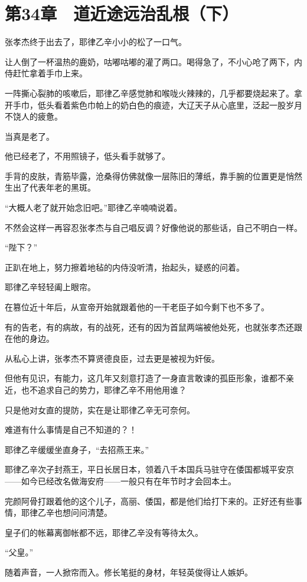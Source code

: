 \section{第34章　道近途远治乱根（下）}

张孝杰终于出去了，耶律乙辛小小的松了一口气。

让人倒了一杯温热的鹿奶，咕嘟咕嘟的灌了两口。喝得急了，不小心呛了两下，内侍赶忙拿着手巾上来。

一阵撕心裂肺的咳嗽后，耶律乙辛感觉肺和喉咙火辣辣的，几乎都要烧起来了。拿开手巾，低头看着紫色巾帕上的奶白色的痕迹，大辽天子从心底里，泛起一股岁月不饶人的疲惫。

当真是老了。

他已经老了，不用照镜子，低头看手就够了。

手背的皮肤，青筋毕露，沧桑得仿佛就像一层陈旧的薄纸，靠手腕的位置更是悄然生出了代表年老的黑斑。

“大概人老了就开始念旧吧。”耶律乙辛喃喃说着。

不然会这样一再容忍张孝杰与自己唱反调？好像他说的那些话，自己不明白一样。

“陛下？”

正趴在地上，努力擦着地毡的内侍没听清，抬起头，疑惑的问着。

耶律乙辛轻轻阖上眼帘。

在篡位近十年后，从宣帝开始就跟着他的一干老臣子如今剩下也不多了。

有的告老，有的病故，有的战死，还有的因为首鼠两端被他处死，也就张孝杰还跟在他的身边。

从私心上讲，张孝杰不算贤德良臣，过去更是被视为奸佞。

但他有见识，有能力，这几年又刻意打造了一身直言敢谏的孤臣形象，谁都不亲近，也不追求自己的势力，耶律乙辛不用他用谁？

只是他对女直的提防，实在是让耶律乙辛无可奈何。

难道有什么事情是自己不知道的？！

耶律乙辛缓缓坐直身子，“去招燕王来。”

耶律乙辛次子封燕王，平日长居日本，领着八千本国兵马驻守在倭国都城平安京——如今已经改名做海安府——一般只有在年节时才会回本土。

完颜阿骨打跟着他的这个儿子，高丽、倭国，都是他们给打下来的。正好还有些事情，耶律乙辛也想问问清楚。

皇子们的帐幕离御帐都不远，耶律乙辛没有等待太久。

“父皇。”

随着声音，一人掀帘而入。修长笔挺的身材，年轻英俊得让人嫉妒。


